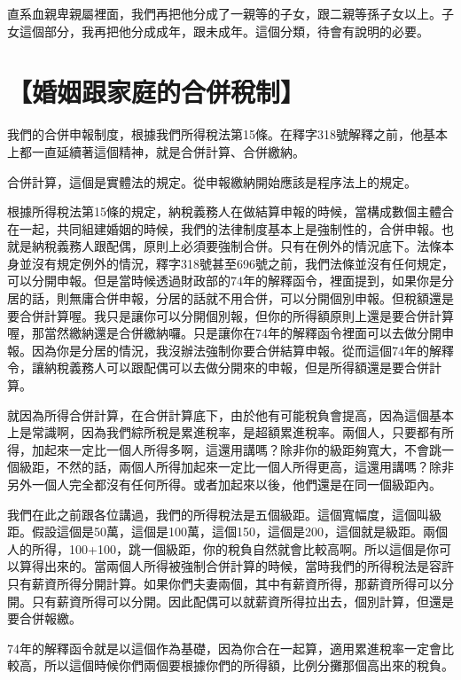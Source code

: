 \documentclass[]{ctexbook}
\begin{document}
直系血親卑親屬裡面，我們再把他分成了一親等的子女，跟二親等孫子女以上。子女這個部分，我再把他分成成年，跟未成年。這個分類，待會有說明的必要。

\hypertarget{ux5a5aux59fbux8ddfux5bb6ux5eadux7684ux5408ux4f75ux7a05ux5236}{%
\section{【婚姻跟家庭的合併稅制】}\label{ux5a5aux59fbux8ddfux5bb6ux5eadux7684ux5408ux4f75ux7a05ux5236}}

我們的合併申報制度，根據我們所得稅法第15條。在釋字318號解釋之前，他基本上都一直延續著這個精神，就是合併計算、合併繳納。

合併計算，這個是實體法的規定。從申報繳納開始應該是程序法上的規定。

根據所得稅法第15條的規定，納稅義務人在做結算申報的時候，當構成數個主體合在一起，共同組建婚姻的時候，我們的法律制度基本上是強制性的，合併申報。也就是納稅義務人跟配偶，原則上必須要強制合併。只有在例外的情況底下。法條本身並沒有規定例外的情況，釋字318號甚至696號之前，我們法條並沒有任何規定，可以分開申報。但是當時候透過財政部的74年的解釋函令，裡面提到，如果你是分居的話，則無庸合併申報，分居的話就不用合併，可以分開個別申報。但稅額還是要合併計算喔。我只是讓你可以分開個別報，但你的所得額原則上還是要合併計算喔，那當然繳納還是合併繳納囉。只是讓你在74年的解釋函令裡面可以去做分開申報。因為你是分居的情況，我沒辦法強制你要合併結算申報。從而這個74年的解釋令，讓納稅義務人可以跟配偶可以去做分開來的申報，但是所得額還是要合併計算。

就因為所得合併計算，在合併計算底下，由於他有可能稅負會提高，因為這個基本上是常識啊，因為我們綜所稅是累進稅率，是超額累進稅率。兩個人，只要都有所得，加起來一定比一個人所得多啊，這還用講嗎？除非你的級距夠寬大，不會跳一個級距，不然的話，兩個人所得加起來一定比一個人所得更高，這還用講嗎？除非另外一個人完全都沒有任何所得。或者加起來以後，他們還是在同一個級距內。

我們在此之前跟各位講過，我們的所得稅法是五個級距。這個寬幅度，這個叫級距。假設這個是50萬，這個是100萬，這個150，這個是200，這個就是級距。兩個人的所得，100+100，跳一個級距，你的稅負自然就會比較高啊。所以這個是你可以算得出來的。當兩個人所得被強制合併計算的時候，當時我們的所得稅法是容許只有薪資所得分開計算。如果你們夫妻兩個，其中有薪資所得，那薪資所得可以分開。只有薪資所得可以分開。因此配偶可以就薪資所得拉出去，個別計算，但還是要合併報繳。

74年的解釋函令就是以這個作為基礎，因為你合在一起算，適用累進稅率一定會比較高，所以這個時候你們兩個要根據你們的所得額，比例分攤那個高出來的稅負。
\end{document}
